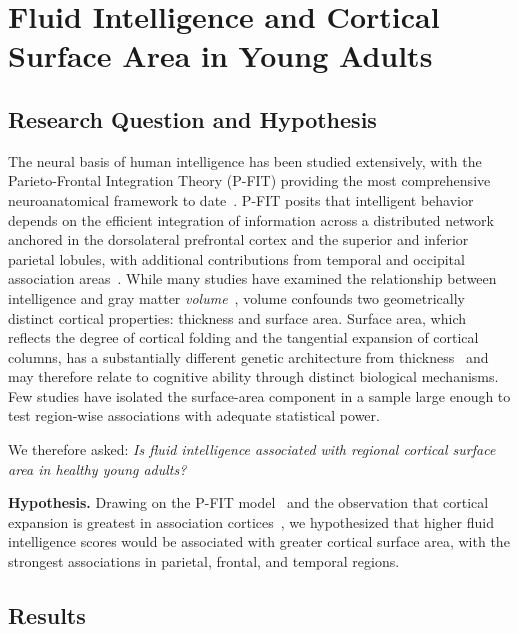 
\section{Fluid Intelligence and Cortical Surface Area in Young Adults}
\label{sec:rq2}

\subsection{Research Question and Hypothesis}

The neural basis of human intelligence has been studied extensively, with the Parieto-Frontal Integration Theory (P-FIT) providing the most comprehensive neuroanatomical framework to date~\cite{jung2007pfit}.
P-FIT posits that intelligent behavior depends on the efficient integration of information across a distributed network anchored in the dorsolateral prefrontal cortex and the superior and inferior parietal lobules, with additional contributions from temporal and occipital association areas~\cite{jung2007pfit, colom2009human}.
While many studies have examined the relationship between intelligence and gray matter \textit{volume}~\cite{pietschnig2015meta}, volume confounds two geometrically distinct cortical properties: thickness and surface area.
Surface area, which reflects the degree of cortical folding and the tangential expansion of cortical columns, has a substantially different genetic architecture from thickness~\cite{grasby2020genetic} and may therefore relate to cognitive ability through distinct biological mechanisms.
Few studies have isolated the surface-area component in a sample large enough to test region-wise associations with adequate statistical power.

We therefore asked: \textit{Is fluid intelligence associated with regional cortical surface area in healthy young adults?}

\textbf{Hypothesis.}
Drawing on the P-FIT model~\cite{jung2007pfit} and the observation that cortical expansion is greatest in association cortices~\cite{grasby2020genetic}, we hypothesized that higher fluid intelligence scores would be associated with greater cortical surface area, with the strongest associations in parietal, frontal, and temporal regions.

\subsection{Results}

